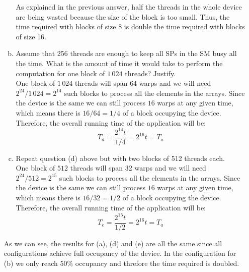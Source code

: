 \documentclass{article}
\begin{document}
\begin{enumerate}[1.]
\begin{enumerate}[(a)]
        As explained in the previous answer, half the threads in the whole device are being wasted because the size of the block is too small. Thus, the time required with blocks of size 8 is double the time required with blocks of size 16.
        \item Assume that 256 threads are enough to keep all SPs in the SM busy all the time. What is
        the amount of time it would take to perform the computation for one block of $1\,024$ threads? Justify.\\
        One block of $1\,024$ threads will span $64$ warps and we will need $2^{24}/1\,024=2^{14}$ such blocks to process all the elements in the arrays. Since the device is the same we can still process $16$ warps at any given time, which means there is $16/64=1/4$ of a block occupying the device. Therefore, the overall  running time of the application will be: 
        \begin{equation*}
            T_d = \frac{2^{14}t}{1/4} = 2^{16}t = T_a
        \end{equation*}
        \item Repeat question (d) above but with two blocks of 512 threads each.\\
        One block of $512$ threads will span $32$ warps and we will need $2^{24}/512=2^{15}$ such blocks to process all the elements in the arrays. Since the device is the same we can still process $16$ warps at any given time, which means there is $16/32=1/2$ of a block occupying the device. Therefore, the overall  running time of the application will be: 
        \begin{equation*}
            T_e = \frac{2^{15}t}{1/2} = 2^{16}t = T_a
        \end{equation*}
    \end{enumerate}
    As we can see, the results for (a), (d) and (e) are all the same since all configurations achieve full occupancy of the device. In the configuration for (b) we only reach $50\%$ occupancy and threfore the time required is doubled.
    

\end{enumerate}
\end{document}
